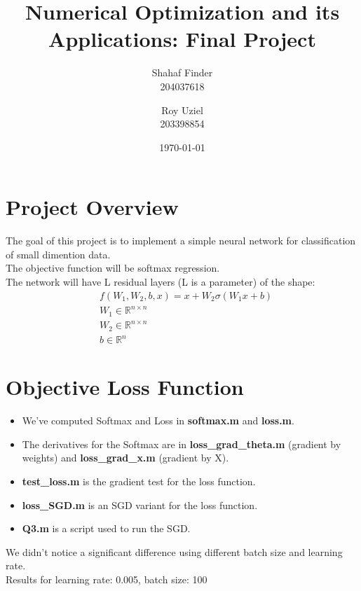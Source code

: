 \documentclass{article}
\title{Numerical Optimization and its Applications: Final Project}
\author{
    Shahaf Finder\\
    204037618
    \and
    Roy Uziel\\
    203398854
}
\date{\today}
\numberwithin{equation}{section}
\begin{document}
\maketitle

\section{Project Overview}
The goal of this project is to implement a simple neural network for classification of small dimention data.\\

The objective function will be softmax regression.\\
The network will have L residual layers (L is a parameter) of the shape:
\begin{equation*}
\begin{split}
 &  f(W_1, W_2, b, x) = x + W_2 \sigma (W_1 x + b)\\
 & W_1 \in \mathbb{R}^{n \times n}\\
 & W_2 \in \mathbb{R}^{n \times n}\\
 & b \in \mathbb{R}^{n}
\end{split}
\end{equation*}

\section{Objective Loss Function}
\begin{itemize}
 \item
  We've computed Softmax and Loss in \textbf{softmax.m} and \textbf{loss.m}.
  \item
  The derivatives for the Softmax are in \textbf{loss{\_}grad{\_}theta.m} (gradient by weights) and \textbf{loss{\_}grad{\_}x.m} (gradient by X).
  \item
  \textbf{test{\_}loss.m} is the gradient test for the loss function.
  \item
 \textbf{ loss{\_}SGD.m} is an SGD variant for the loss function.
  \item
  \textbf{Q3.m} is a script used to run the SGD.
\end{itemize}
We didn't notice a significant difference using different batch size and learning rate.\\

Results for learning rate: 0.005, batch size: 100\\
\end{document}
